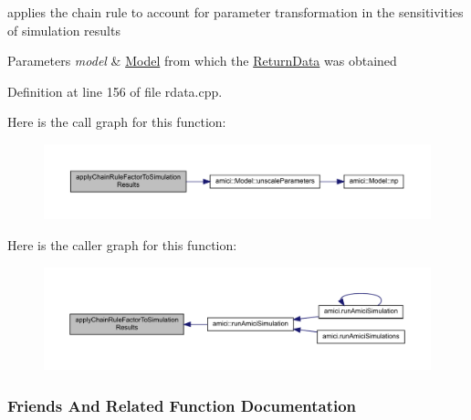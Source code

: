 applies the chain rule to account for parameter transformation in the sensitivities of simulation results 
\begin{DoxyParams}{Parameters}
{\em model} & \mbox{\hyperlink{classamici_1_1_model}{Model}} from which the \mbox{\hyperlink{classamici_1_1_return_data}{Return\+Data}} was obtained\\
\hline
\end{DoxyParams}


Definition at line 156 of file rdata.\+cpp.

Here is the call graph for this function\+:
\nopagebreak
\begin{figure}[H]
\begin{center}
\leavevmode
\includegraphics[width=350pt]{classamici_1_1_return_data_adce202dc864a1e65d8453f597de271f5_cgraph}
\end{center}
\end{figure}
Here is the caller graph for this function\+:
\nopagebreak
\begin{figure}[H]
\begin{center}
\leavevmode
\includegraphics[width=350pt]{classamici_1_1_return_data_adce202dc864a1e65d8453f597de271f5_icgraph}
\end{center}
\end{figure}


\subsubsection{Friends And Related Function Documentation}
\mbox{\label{classamici_1_1_return_data_af3646925990e46131d1bc92b5a7c0dc4}} 
